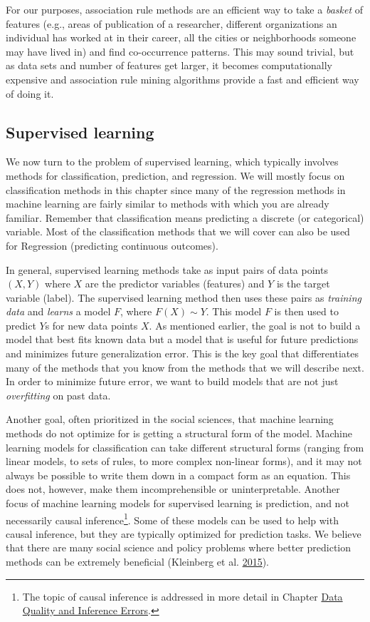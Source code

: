 \documentclass[]{krantz}
\begin{document}
For our purposes, association rule methods are an efficient way to take
a \emph{basket} of features (e.g., areas of publication of a researcher,
different organizations an individual has worked at in their career, all
the cities or neighborhoods someone may have lived in) and find
co-occurrence patterns. This may sound trivial, but as data sets and
number of features get larger, it becomes computationally expensive and
association rule mining algorithms provide a fast and efficient way of
doing it.

\subsection{Supervised learning}\label{sec:MLchapter:super}

We now turn to the problem of supervised learning, which typically
involves methods for classification, prediction, and regression. We will
mostly focus on classification methods in this chapter since many of the
regression methods in machine learning are fairly similar to methods
with which you are already familiar. Remember that classification means
predicting a discrete (or categorical) variable. Most of the
classification methods that we will cover can also be used for
Regression (predicting continuous outcomes).

In general, supervised learning methods take as input pairs of data
points \((X,Y)\) where \(X\) are the predictor variables (features) and
\(Y\) is the target variable (label). The supervised learning method
then uses these pairs as \emph{training data} and \emph{learns} a model
\(F\), where \(F(X)\sim Y\). This model \(F\) is then used to predict
\(Y\)s for new data points \(X\). As mentioned earlier, the goal is not
to build a model that best fits known data but a model that is useful
for future predictions and minimizes future generalization error. This
is the key goal that differentiates many of the methods that you know
from the methods that we will describe next. In order to minimize future
error, we want to build models that are not just \emph{overfitting} on
past data.

Another goal, often prioritized in the social sciences, that machine
learning methods do not optimize for is getting a structural form of the
model. Machine learning models for classification can take different
structural forms (ranging from linear models, to sets of rules, to more
complex non-linear forms), and it may not always be possible to write
them down in a compact form as an equation. This does not, however, make
them incomprehensible or uninterpretable. Another focus of machine
learning models for supervised learning is prediction, and not
necessarily causal inference\footnote{The topic of causal inference is
  addressed in more detail in Chapter
  \protect\hyperlink{chap:errors}{Data Quality and Inference Errors}.}.
Some of these models can be used to help with causal inference, but they
are typically optimized for prediction tasks. We believe that there are
many social science and policy problems where better prediction methods
can be extremely beneficial (Kleinberg et al.
\protect\hyperlink{ref-Kleinberg2015}{2015}).
\end{document}
